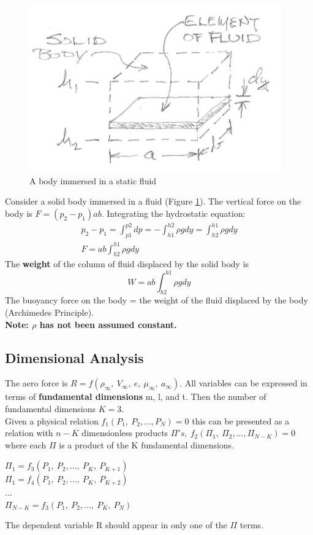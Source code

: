 \documentclass[draft=false, titlepage]{article}
\begin{document}
\begin{figure}[ht]
    \centering
    \includegraphics[width=0.4\linewidth]{Figures/bodyInFluid.PNG}
    \caption{A body immersed in a static fluid}
    \label{fig:bodyInFluid}
\end{figure}
Consider a solid body immersed in a fluid (Figure \ref{fig:bodyInFluid}). The vertical force on the body is $F=(p_2-p_1)ab$. Integrating the hydrostatic equation:
\begin{gather*}
    p_2-p_1 = \int_{p1}^{p2} dp = -\int_{h1}^{h2} \rho g dy = \int_{h2}^{h1} \rho g dy\\
    F = ab\int_{h2}^{h1} \rho g dy
\end{gather*}
The \textbf{weight} of the column of fluid displaced by the solid body is
\begin{equation*}
    W = ab \int_{h2}^{h1} \rho g dy
\end{equation*}
The buoyancy force on the body = the weight of the fluid displaced by the body (Archimedes Principle).\\
\textbf{Note: $\rho$ has not been assumed constant.}

\subsection{Dimensional Analysis}
The aero force is $R=f(\rho_\infty,\ V_\infty,\ e,\ \mu_\infty,\ a_\infty)$. All variables can be expressed in terms of \textbf{fundamental dimensions} m, l, and t. Then the number of fundamental dimensions $K=3$.\\
Given a physical relation $f_1(P_1,\ P_2,...,P_N) = 0$ this can be presented as a relation with $n-K$ dimensionless products $\Pi's,\ f_2(\Pi_1,\ \Pi_2,...,\Pi_{N-K})=0$ where each $\Pi$ is a product of the K fundamental dimensions.
\begin{center}
    $\Pi_1 = f_3(P_1,\ P_2,...,\ P_K,\ P_{K+1})$\\
    $\Pi_1 = f_4(P_1,\ P_2,...,\ P_K,\ P_{K+2})$\\
    ...\\
    $\Pi_{N-K} = f_3(P_1,\ P_2,...,\ P_K,\ P_{N})$
\end{center}
The dependent variable R should appear in only one of the $\Pi$ terms.
\end{document}
